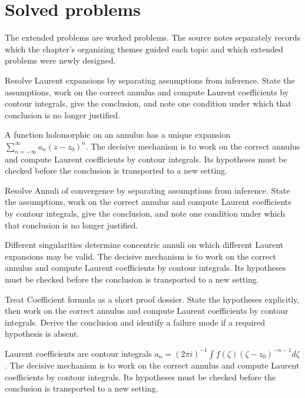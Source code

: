 \section{Solved problems}
The extended problems are worked problems. The source notes separately records which the chapter's organizing themes guided each topic and which extended problems were newly designed.

\begin{problem}\label{prob:iv08-problem-01}
Resolve Laurent expansions by separating assumptions from inference. State the assumptions, work on the correct annulus and compute Laurent coefficients by contour integrals, give the conclusion, and note one condition under which that conclusion is no longer justified.
\end{problem}
\begin{solution}
A function holomorphic on an annulus has a unique expansion $\sum_{n=-\infty}^{\infty}a_n(z-z_0)^n$. The decisive mechanism is to work on the correct annulus and compute Laurent coefficients by contour integrals. Its hypotheses must be checked before the conclusion is transported to a new setting.
\end{solution}

\begin{problem}\label{prob:iv08-problem-02}
Resolve Annuli of convergence by separating assumptions from inference. State the assumptions, work on the correct annulus and compute Laurent coefficients by contour integrals, give the conclusion, and note one condition under which that conclusion is no longer justified.
\end{problem}
\begin{solution}
Different singularities determine concentric annuli on which different Laurent expansions may be valid. The decisive mechanism is to work on the correct annulus and compute Laurent coefficients by contour integrals. Its hypotheses must be checked before the conclusion is transported to a new setting.
\end{solution}

\begin{problem}\label{prob:iv08-problem-03}
Treat Coefficient formula as a short proof dossier. State the hypotheses explicitly, then work on the correct annulus and compute Laurent coefficients by contour integrals. Derive the conclusion and identify a failure mode if a required hypothesis is absent.
\end{problem}
\begin{solution}
Laurent coefficients are contour integrals $a_n=(2\pi i)^{-1}\int f(\zeta)(\zeta-z_0)^{-n-1}d\zeta$. The decisive mechanism is to work on the correct annulus and compute Laurent coefficients by contour integrals. Its hypotheses must be checked before the conclusion is transported to a new setting.
\end{solution}

